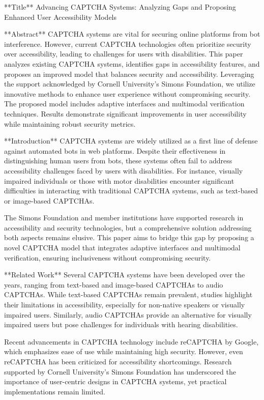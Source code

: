 **Title**  
Advancing CAPTCHA Systems: Analyzing Gaps and Proposing Enhanced User Accessibility Models  

**Abstract**  
CAPTCHA systems are vital for securing online platforms from bot interference. However, current CAPTCHA technologies often prioritize security over accessibility, leading to challenges for users with disabilities. This paper analyzes existing CAPTCHA systems, identifies gaps in accessibility features, and proposes an improved model that balances security and accessibility. Leveraging the support acknowledged by Cornell University's Simons Foundation, we utilize innovative methods to enhance user experience without compromising security. The proposed model includes adaptive interfaces and multimodal verification techniques. Results demonstrate significant improvements in user accessibility while maintaining robust security metrics.  

**Introduction**  
CAPTCHA systems are widely utilized as a first line of defense against automated bots in web platforms. Despite their effectiveness in distinguishing human users from bots, these systems often fail to address accessibility challenges faced by users with disabilities. For instance, visually impaired individuals or those with motor disabilities encounter significant difficulties in interacting with traditional CAPTCHA systems, such as text-based or image-based CAPTCHAs.  

The Simons Foundation and member institutions have supported research in accessibility and security technologies, but a comprehensive solution addressing both aspects remains elusive. This paper aims to bridge this gap by proposing a novel CAPTCHA model that integrates adaptive interfaces and multimodal verification, ensuring inclusiveness without compromising security.  

**Related Work**  
Several CAPTCHA systems have been developed over the years, ranging from text-based and image-based CAPTCHAs to audio CAPTCHAs. While text-based CAPTCHAs remain prevalent, studies highlight their limitations in accessibility, especially for non-native speakers or visually impaired users. Similarly, audio CAPTCHAs provide an alternative for visually impaired users but pose challenges for individuals with hearing disabilities.  

Recent advancements in CAPTCHA technology include reCAPTCHA by Google, which emphasizes ease of use while maintaining high security. However, even reCAPTCHA has been criticized for accessibility shortcomings. Research supported by Cornell University's Simons Foundation has underscored the importance of user-centric designs in CAPTCHA systems, yet practical implementations remain limited.  

